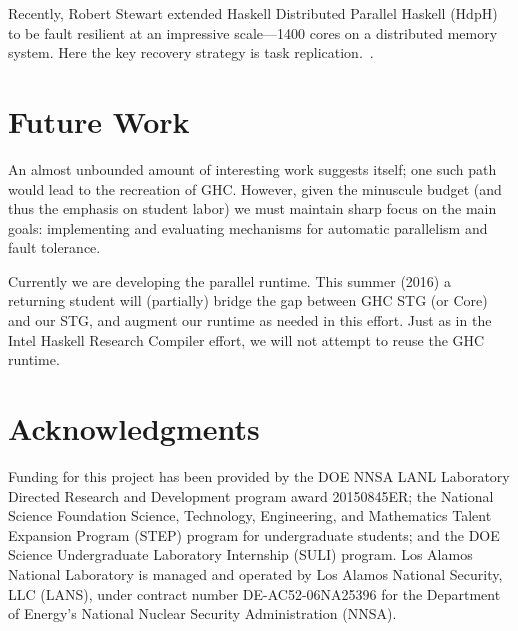 \documentclass{llncs}
\begin{document}
Recently, Robert Stewart extended Haskell Distributed Parallel Haskell
(HdpH)~\cite{hdph} to be fault resilient at an impressive scale---1400 cores
on a distributed memory system.  Here the key recovery strategy is task
replication.~\cite{Stewart:2013}.

\section{Future Work}

An almost unbounded amount of interesting work suggests itself; one such path
would lead to the recreation of GHC.  However, given the minuscule budget (and
thus the emphasis on student labor) we must maintain sharp focus on the main
goals:  implementing and evaluating mechanisms for automatic parallelism and
fault tolerance.

Currently we are developing the parallel runtime.  This summer (2016) a
returning student will (partially) bridge the gap between GHC STG (or Core)
and our STG, and augment our runtime as needed in this effort.  Just as in the
Intel Haskell Research Compiler effort, we will not attempt to reuse the GHC
runtime.

\section{Acknowledgments}

Funding for this project has been provided by the DOE NNSA LANL Laboratory
Directed Research and Development program award 20150845ER; the National
Science Foundation Science, Technology, Engineering, and Mathematics Talent
Expansion Program (STEP) program for undergraduate students; and the DOE
Science Undergraduate Laboratory Internship (SULI) program.
%
Los Alamos National Laboratory is managed and operated by Los Alamos National
Security, LLC (LANS), under contract number DE-AC52-06NA25396 for the
Department of Energy’s National Nuclear Security Administration (NNSA).


%
%




\end{document}
